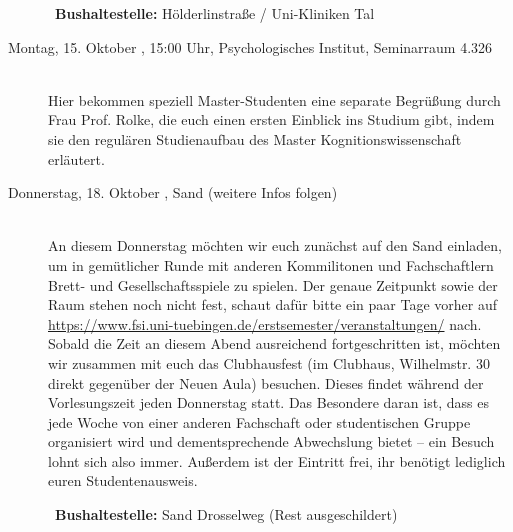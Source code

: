 \begin{description}
~\textbf{Bushaltestelle:} Hölderlinstraße / Uni-Kliniken Tal
\fi

\ifkogwiss
\ifmaster
\item[Montag, 15. Oktober \Jahr, 15:00 Uhr, Psychologisches Institut, Seminarraum 4.326 ]\ \\
Hier bekommen speziell Master-Studenten eine separate Begrüßung durch Frau Prof. Rolke, die euch einen ersten Einblick ins Studium gibt, indem sie den regulären Studienaufbau des Master Kognitionswissenschaft erläutert. %
\fi
\fi




\item[Donnerstag, 18. Oktober \Jahr,  Sand (weitere Infos folgen)]\ \\
An diesem Donnerstag möchten wir euch zunächst auf den Sand einladen, um in gemütlicher Runde mit anderen Kommilitonen und Fachschaftlern Brett- und Gesellschaftsspiele zu spielen. Der genaue Zeitpunkt sowie der Raum stehen noch nicht fest, schaut dafür bitte ein paar Tage vorher auf \url{https://www.fsi.uni-tuebingen.de/erstsemester/veranstaltungen/} nach.\\ Sobald die Zeit an diesem Abend ausreichend fortgeschritten ist, möchten wir zusammen mit euch das Clubhausfest (im Clubhaus, Wilhelmstr. 30 direkt gegenüber der Neuen Aula) besuchen. Dieses findet während der Vorlesungszeit jeden Donnerstag statt. Das Besondere daran ist, dass es jede Woche von einer anderen Fachschaft oder studentischen Gruppe organisiert wird und dementsprechende Abwechslung bietet -- ein Besuch lohnt sich also immer. Außerdem ist der Eintritt frei, ihr benötigt lediglich euren Studentenausweis.

~\textbf{Bushaltestelle:} Sand Drosselweg (Rest ausgeschildert)

~\\

\end{description}
